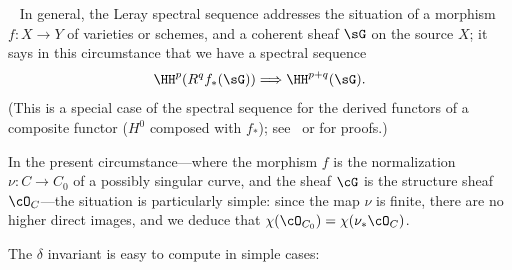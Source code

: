 \begin{fact}~\label{Leray}
 In general, the Leray spectral sequence addresses the situation of  a morphism $f:X\to Y$ of varieties or schemes, 
 and a coherent sheaf $\sG$  on the source $X$; it says in this circumstance that we have a spectral sequence
  $$
  \HH^p(R^qf_*(\sG)) \Longrightarrow \HH^{p+q}(\sG).
  $$
(This is a special case of the spectral sequence for the derived functors of a composite functor ($H^0$ composed with $f_*$);
see~\cite[II.4.17.1]{Godement} or \cite[Section III.7]{Gelfand-Manin} for proofs.)

In the present circumstance---where the morphism $f$ is the normalization $\nu : C \to C_0$ of a possibly singular curve, and the sheaf $\cG$ is the structure sheaf $\cO_C$---the situation is particularly simple: since the map $\nu$ is finite, there are no higher direct images, and we deduce that $\chi(\cO_{C_0}) = \chi(\nu_*\cO_C)$.
\end{fact}

The $\delta$ invariant is easy to compute in simple cases:


